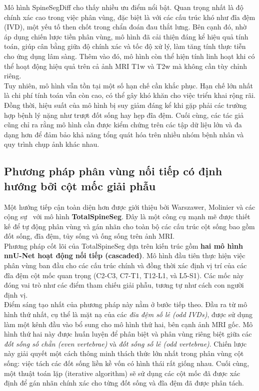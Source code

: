 Mô hình SpineSegDiff cho thấy nhiều ưu điểm nổi bật. Quan trọng nhất là độ chính xác cao trong việc phân vùng, đặc biệt là với các cấu trúc khó như đĩa đệm (IVD), một yếu tố then chốt trong chẩn đoán đau thắt lưng. Bên cạnh đó, nhờ áp dụng chiến lược tiền phân vùng, mô hình đã cải thiện đáng kể hiệu quả tính toán, giúp cân bằng giữa độ chính xác và tốc độ xử lý, làm tăng tính thực tiễn cho ứng dụng lâm sàng. Thêm vào đó, mô hình còn thể hiện tính linh hoạt khi có thể hoạt động hiệu quả trên cả ảnh MRI T1w và T2w mà không cần tùy chỉnh riêng.\\

Tuy nhiên, mô hình vẫn tồn tại một số hạn chế cần khắc phục. Hạn chế lớn nhất là chi phí tính toán vẫn còn cao, có thể gây khó khăn cho việc triển khai rộng rãi. Đồng thời, hiệu suất của mô hình bị suy giảm đáng kể khi gặp phải các trường hợp bệnh lý nặng như trượt đốt sống hay hẹp đĩa đệm. Cuối cùng, các tác giả cũng chỉ ra rằng mô hình cần được kiểm chứng trên các tập dữ liệu lớn và đa dạng hơn để đảm bảo khả năng tổng quát hóa trên nhiều nhóm bệnh nhân và quy trình chụp ảnh khác nhau.\\
\subsection{Phương pháp phân vùng nối tiếp có định hướng bởi cột mốc giải phẫu}
Một hướng tiếp cận toàn diện hơn được giới thiệu bởi Warszawer, Molinier và các cộng sự~\cite{warszawer2025totalspineseg} với mô hình \textbf{TotalSpineSeg}. Đây là một công cụ mạnh mẽ được thiết kế để tự động phân vùng và gán nhãn cho toàn bộ các cấu trúc cột sống bao gồm đốt sống, đĩa đệm, tủy sống và ống sống trên ảnh MRI.\\

Phương pháp cốt lõi của TotalSpineSeg dựa trên kiến trúc gồm \textbf{hai mô hình nnU-Net hoạt động nối tiếp (cascaded)}. Mô hình đầu tiên thực hiện việc phân vùng ban đầu cho các cấu trúc chính và đồng thời xác định vị trí của các đĩa đệm cột mốc quan trọng (C2-C3, C7-T1, T12-L1, và L5-S1). Các mốc này đóng vai trò như các điểm tham chiếu giải phẫu, tương tự như cách con người định vị.\\

Điểm sáng tạo nhất của phương pháp này nằm ở bước tiếp theo. Đầu ra từ mô hình thứ nhất, cụ thể là mặt nạ của các \textit{đĩa đệm số lẻ (odd IVDs)}, được sử dụng làm một kênh đầu vào bổ sung cho mô hình thứ hai, bên cạnh ảnh MRI gốc. Mô hình thứ hai này được huấn luyện để phân biệt và phân vùng riêng biệt giữa các \textit{đốt sống số chẵn (even vertebrae)} và \textit{đốt sống số lẻ (odd vertebrae)}. Chiến lược này giải quyết một cách thông minh thách thức lớn nhất trong phân vùng cột sống: việc tách các đốt sống liền kề vốn có hình thái rất giống nhau. Cuối cùng, một thuật toán lặp (iterative algorithm) sẽ sử dụng các cột mốc đã được xác định để gán nhãn chính xác cho từng đốt sống và đĩa đệm đã được phân tách.\\

